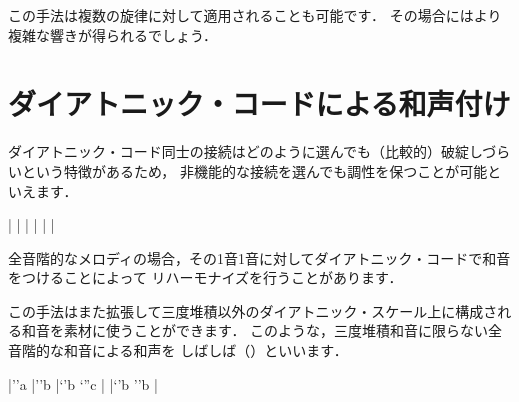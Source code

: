 \documentclass[dvipdfmx,uplatex,b5paper,openany,jbase=12Q,nomag*,textwidth-limit=44%
               ]{gachimuchi}[2020/05/05]
\begin{document}
この手法は複数の旋律に対して適用されることも可能です．
その場合にはより複雑な響きが得られるでしょう．


\section{ダイアトニック・コードによる和声付け}
ダイアトニック・コード同士の接続はどのように選んでも（比較的）破綻しづらいという特徴があるため，
非機能的な接続を選んでも調性を保つことが可能といえます．

\begin{Music}[.6\linewidth]
  \Startpiece%
  \NOTes
  |%
  \en\NOtesp
  |%
  \en\Notes
  |%
  \en\bar
  \NOTes
  |%
  \en\NOtes
  |%
  \en
  \setdoublebar\endpiece%
\end{Music}

全音階的なメロディの場合，その1音1音に対してダイアトニック・コードで和音をつけることによって
リハーモナイズを行うことがあります．

この手法はまた拡張して三度堆積以外のダイアトニック・スケール上に構成される和音を素材に使うことができます．
このような，三度堆積和音に限らない全音階的な和音による和声を
しばしば（）といいます．

\begin{Music}[.6\linewidth]
  \Startpiece%
  \znotes{}\en\NOtes
  |\rq{'a}%
  \en\Notes
  \sk{}%
  |\rq{'b}%
  \en\NOtes
  |\lq{'b}%
  \lq{''c}%
  \en\bar
  \NOtes
  |\lq{'b}%
  \rq{'b}%
  \en\NOTes
  |%
  \en\def\atnextbar{\znotes\centerbar{\duevolte}\en}%
  \setdoublebar\endpiece%
\end{Music}
\end{document}
